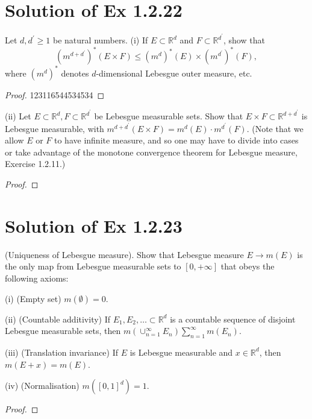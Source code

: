 \documentclass[reqno,a4paper,14pt]{amsart}
\begin{document}
\section{Solution of Ex 1.2.22}
Let $d,d^\prime\geq 1$ be natural numbers. (i) If $E\subset \mathbb{R}^d$ and $F\subset \mathbb{R}^{d^\prime}$, show that 
\begin{equation*}
    (m^{d+d^\prime})^*(E\times F)\leq (m^d)^*(E)\times (m^{d^\prime})^*(F),
\end{equation*}
where $(m^d)^*$ denotes $d$-dimensional Lebesgue outer measure, etc.      
\begin{proof}
    123116544534534
\end{proof}
(ii) Let $E\subset \mathbb{R}^d, F\subset \mathbb{R}^{d^\prime}$ be Lebesgue measurable sets. Show that $E\times F\subset \mathbb{R}^{d+d^\prime}$ is Lebesgue measurable, with $m^{d+d^\prime}(E\times F)=m^d(E) · m^{d^\prime}(F)$. (Note that we allow $E$ or $F$ to have infinite measure, and so one may have to divide into cases or take advantage of the monotone convergence theorem for Lebesgue measure, Exercise 1.2.11.)
\begin{proof}
    
\end{proof}


\section{Solution of Ex 1.2.23}
(Uniqueness of Lebesgue measure). Show that Lebesgue measure $E\to m(E)$ is the only map from Lebesgue measurable sets to $[0,+\infty]$ that obeys the following axioms:

(i) (Empty set) $m(\emptyset) =0$.

(ii) (Countable additivity) If $E_1,E_2,\dots \subset \mathbb{R}^d$ is a countable sequence of disjoint Lebesgue measurable sets, then $m(\cup_{n=1}^\infty E_n)\sum_{n=1}^\infty m(E_n)$.

(iii) (Translation invariance) If $E$ is Lebesgue measurable and $x\in \mathbb{R}^d$, then $m(E+x)=m(E)$.

(iv) (Normalisation) $m([0,1]^d)=1$.
\begin{proof}
    
\end{proof}
\end{document}

